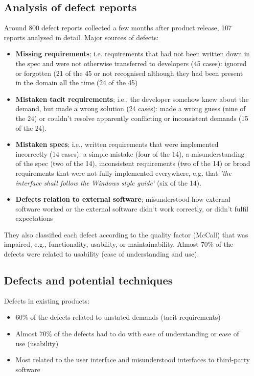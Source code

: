 \subsection{Analysis of defect reports}
Around 800 defect reports collected a few months after product release, 107 reports analysed in detail. Major sources of defects:
\begin{itemize}
    \item \textbf{Missing requirements}; i.e. requirements that had not been written down in the spec and were not otherwise transferred to developers (45 cases): ignored or forgotten (21 of the 45 or not recognised although they had been present in the domain all the time (24 of the 45)
    \item \textbf{Mistaken tacit requirements}; i.e., the developer somehow knew about the demand, but made a wrong solution (24 cases): made a wrong guess (nine of the 24) or couldn't resolve apparently conflicting or inconsistent demands (15 of the 24).
    \item \textbf{Mistaken specs}; i.e., written requirements that were implemented incorrectly (14 cases): a simple mistake (four of the 14), a misunderstanding of the spec (two of the 14), inconsistent requirements (two of the 14) or broad requirements that were not fully implemented everywhere, e.g. that \textit{'the interface shall follow the Windows style guide'} (six of the 14).
    \item \textbf{Defects relation to external software}; misunderstood how external software worked or the external software didn't work correctly, or didn't fulfil expectations
\end{itemize}

They also classified each defect according to the quality factor (McCall) that was impaired, e.g., functionality, usability, or maintainability. Almost 70\% of the defects were related to usability (ease of understanding and use).

\subsection{Defects and potential techniques}
Defects in existing products:

\begin{itemize}
    \item 60\% of the defects related to unstated demands (tacit requirements)
    \item Almost 70\% of the defects had to do with ease of understanding or ease of use (usability)
    \item Most related to the user interface and misunderstood interfaces to third-party software
\end{itemize}


